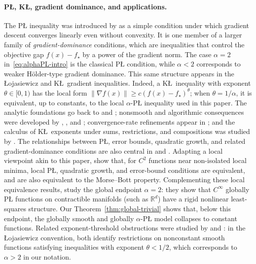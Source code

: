 \documentclass[11pt]{article}
\newcommand{\norm}[1]{\left\lVert #1\right\rVert}
\begin{document}
\paragraph{P\L{}, K\L, gradient dominance, and applications.}
The P\L{} inequality was introduced by \citet{Polyak1963} as a simple condition under which gradient descent converges
linearly even without convexity. It is one member of a larger family of \emph{gradient-dominance} conditions, which are  inequalities that control the objective gap \(f(x)-f_\star\) by a power of the gradient norm. The case
\(\alpha=2\) in~\eqref{eq:alphaPL-intro} is the classical P\L{} condition, while \(\alpha<2\) corresponds to weaker
H\"older-type gradient dominance. This same structure appears in the \L ojasiewicz and K\L\ gradient inequalities. Indeed, a K\L\ inequality
with exponent \(\theta\in[0,1)\) has the local form
\(\norm{\nabla f(x)}\ge c(f(x)-f_\star)^\theta\); when \(\theta=1/\alpha\), it is equivalent, up to constants, to the
local \(\alpha\)-P\L{} inequality used in this paper. The analytic foundations go back to
\citet{Lojasiewicz1963} and \citet{Kurdyka1998}; nonsmooth and algorithmic consequences were developed by
\citet{BolteDaniilidisLewis2007}, \citet{AttouchBolteRedontSoubeyran2010}, and
\citet{BolteSabachTeboulle2014}; convergence-rate refinements appear in
\citet{FrankelGarrigosPeypouquet2015}; and the calculus of K\L\ exponents under sums, restrictions, and compositions
was studied by \citet{LiPong2018}. The relationships between P\L{}, error bounds, quadratic growth, and related
gradient-dominance conditions are also central in \citet{KarimiNutiniSchmidt2016} and
\citet{DrusvyatskyLewis2018}.  Adapting a local viewpoint akin to this paper, \citet{RebjockBoumal2024} show that, for
\(C^2\) functions near non-isolated local minima, local P\L{}, quadratic growth, and error-bound conditions are
equivalent, and are also equivalent to the Morse--Bott property.
Complementing these local equivalence results, \citet{BoumalCriscitielloRebjock2026} study the global endpoint
\(\alpha=2\): they show that \(C^\infty\) globally P\L{} functions on contractible manifolds (such as \(\mathbb{R}^d\)) have a rigid nonlinear
least-squares structure. Our Theorem~\ref{thm:global-trivial} shows that, below this endpoint, the globally smooth and globally \(\alpha\)-P\L{}
model collapses to constant functions.
Related exponent-threshold obstructions were studied by \citet{AbbaszadehpeivastiDeKlerkZamani2023} and
\citet[Remark~2.21]{RebjockBoumal2024}: in the \L{}ojasiewicz convention, both identify restrictions on nonconstant
smooth functions satisfying inequalities with exponent \(\theta<1/2\), which corresponds to \(\alpha>2\) in our
notation.
\end{document}
